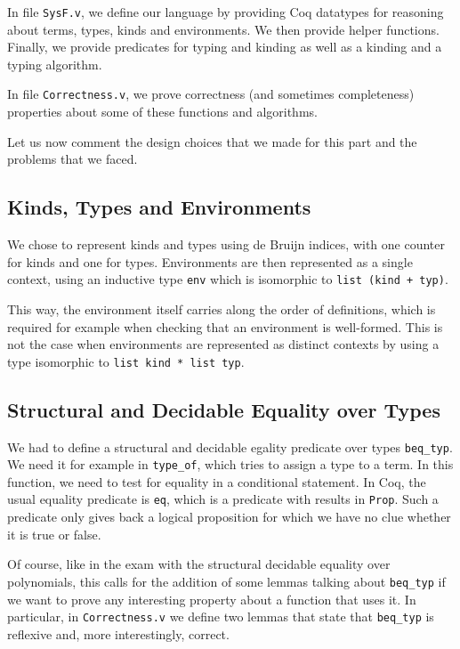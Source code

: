 \documentclass[a4paper,11pt]{article}
\begin{document}
In file \verb|SysF.v|, we define our language by providing Coq
datatypes for reasoning about terms, types, kinds and environments. We
then provide helper functions. Finally, we provide predicates for
typing and kinding as well as a kinding and a typing algorithm.

In file \verb|Correctness.v|, we prove correctness (and sometimes
completeness) properties about some of these functions and algorithms.

Let us now comment the design choices that we made for this part and
the problems that we faced.

\subsection*{Kinds, Types and Environments}

We chose to represent kinds and types using de Bruijn indices, with
one counter for kinds and one for types. Environments are then
represented as a single context, using an inductive type \verb|env|
which is isomorphic to \verb|list (kind + typ)|.

This way, the environment itself carries along the order of
definitions, which is required for example when checking that an
environment is well-formed. This is not the case when environments are
represented as distinct contexts by using a type isomorphic to
\verb|list kind * list typ|.

\subsection*{Structural and Decidable Equality over Types}

We had to define a structural and decidable egality predicate over
types \verb|beq_typ|. We need it for example in \verb|type_of|, which
tries to assign a type to a term. In this function, we need to test
for equality in a conditional statement. In Coq, the usual equality
predicate is \verb|eq|, which is a predicate with results in
\verb|Prop|. Such a predicate only gives back a logical proposition
for which we have no clue whether it is true or false.

Of course, like in the exam with the structural decidable equality over
polynomials, this calls for the addition of some lemmas talking about
\verb|beq_typ| if we want to prove any interesting property about a
function that uses it. In particular, in \verb|Correctness.v| we
define two lemmas that state that \verb|beq_typ| is reflexive and,
more interestingly, correct.
\end{document}
